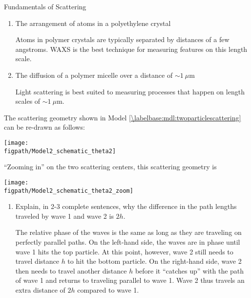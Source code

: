 \begin{activity}{Fundamentals of Scattering}
\begin{ctqs}
\begin{enumerate}
			\item The arrangement of atoms in a polyethylene crystal
			
				\begin{solution}[0.5in]{}
					Atoms in polymer crystals are typically separated by distances of a few angstroms.  WAXS is the best technique for measuring features on this length scale.
				\end{solution}
			
			\item The diffusion of a polymer micelle over a distance of $\sim 1~\mu$m
			
				\begin{solution}[0.5in]{}
					Light scattering is best suited to measuring processes that happen on length scales of $\sim 1~\mu$m.
				\end{solution}
			
		\end{enumerate}
	
\end{ctqs}


\begin{exercises}

	\exercise The scattering geometry shown in Model \ref{\labelbase:mdl:twoparticlescattering} can be re-drawn as follows: \label{\labelbase:exc:deltax}
		
		\vspace{6pt}
	\centerline{\texttt{[image: \\figpath/Model2\_schematic\_theta2]}}
	
	``Zooming in'' on the two scattering centers, this scattering geometry is
		
		\vspace{6pt}	
	\centerline{\texttt{[image: \\figpath/Model2\_schematic\_theta2\_zoom]}}
	
	\begin{enumerate}
		\item Explain, in 2-3 complete sentences, why the difference in the path lengths traveled by wave 1 and wave 2 is $2h$.
		
			\begin{solution}{}
				The relative phase of the waves is the same as long as they are traveling on perfectly parallel paths.  On the left-hand side, the waves are in phase until wave 1 hits the top particle.  At this point, however, wave 2 still needs to travel distance $h$ to hit the bottom particle.  On the right-hand side, wave 2 then needs to travel another distance $h$ before it ``catches up'' with the path of wave 1 and returns to traveling parallel to wave 1.  Wave 2 thus travels an extra distance of $2h$ compared to wave 1.
			\end{solution}
		

\end{enumerate}
\end{exercises}
\end{activity}
